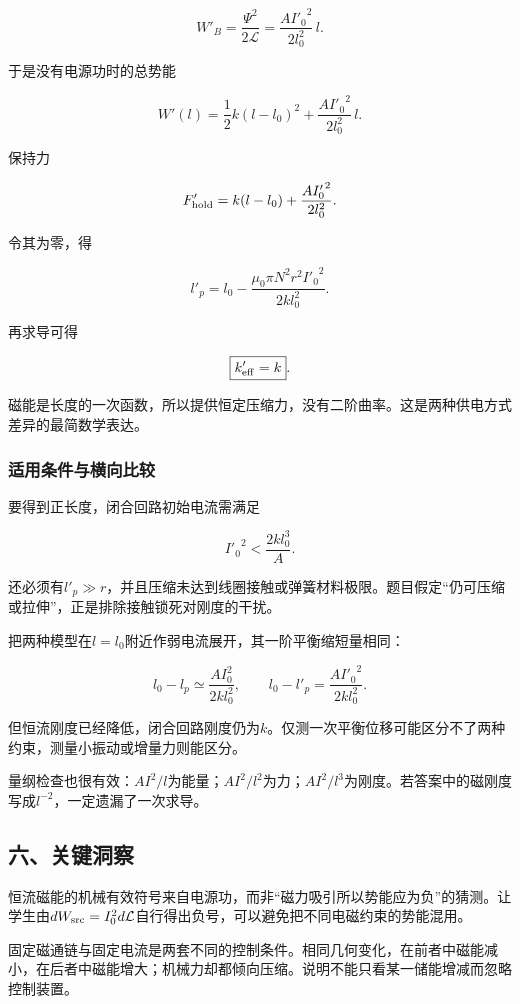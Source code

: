 \documentclass[12pt,a4paper,fontset=fandol]{ctexart}
\begin{document}
\[
W'_B=\frac{\Psi^2}{2\mathcal L}
=\frac{A{I'_0}^2}{2l_0^2}\,l.
\]

于是没有电源功时的总势能

\[
W'(l)=\frac12k(l-l_0)^2
+\frac{A{I'_0}^2}{2l_0^2}\,l.
\]

保持力

\[
F'_{\rm hold}=k(l-l_0)
+\frac{A{I'_0}^2}{2l_0^2}.
\]

令其为零，得

\[
\boxed{l'_p=l_0-\frac{\mu_0\pi N^2r^2{I'_0}^2}{2kl_0^2}}.
\]

再求导可得

\[
\boxed{k'_{\rm eff}=k}.
\]

磁能是长度的一次函数，所以提供恒定压缩力，没有二阶曲率。这是两种供电方式差异的最简数学表达。

\subsubsection{适用条件与横向比较}\label{ux9002ux7528ux6761ux4ef6ux4e0eux6a2aux5411ux6bd4ux8f83}

要得到正长度，闭合回路初始电流需满足

\[
{I'_0}^2<\frac{2kl_0^3}{A}.
\]

还必须有\(l'_p\gg r\)，并且压缩未达到线圈接触或弹簧材料极限。题目假定``仍可压缩或拉伸''，正是排除接触锁死对刚度的干扰。

把两种模型在\(l=l_0\)附近作弱电流展开，其一阶平衡缩短量相同：

\[
l_0-l_p\simeq\frac{AI_0^2}{2kl_0^2},
\qquad
l_0-l'_p=\frac{A{I'_0}^2}{2kl_0^2}.
\]

但恒流刚度已经降低，闭合回路刚度仍为\(k\)。仅测一次平衡位移可能区分不了两种约束，测量小振动或增量力则能区分。

量纲检查也很有效：\(AI^2/l\)为能量；\(AI^2/l^2\)为力；\(AI^2/l^3\)为刚度。若答案中的磁刚度写成\(l^{-2}\)，一定遗漏了一次求导。

\subsection{六、关键洞察}\label{ux516dux5173ux952eux6d1eux5bdf-1}

恒流磁能的机械有效符号来自电源功，而非``磁力吸引所以势能应为负''的猜测。让学生由\(dW_{\rm src}=I_0^2d\mathcal L\)自行得出负号，可以避免把不同电磁约束的势能混用。

固定磁通链与固定电流是两套不同的控制条件。相同几何变化，在前者中磁能减小，在后者中磁能增大；机械力却都倾向压缩。说明不能只看某一储能增减而忽略控制装置。
\end{document}
